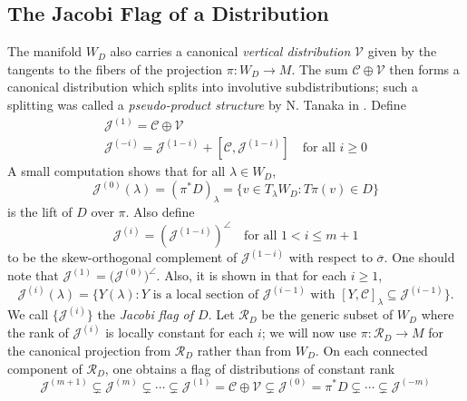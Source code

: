 \documentclass[11pt,letterpaper]{amsart}
\numberwithin{equation}{section}
\newcommand{\oline}{\overline}
\begin{document}
\subsection{The Jacobi Flag of a Distribution}
\label{subsection: CanFlag}
The manifold $W_D$ also carries a canonical \emph{vertical distribution} $\mathcal{V}$ given by the tangents to the fibers of the projection $\pi:W_D\to M$. The sum $\mathcal{C}\oplus \mathcal{V}$ then forms a canonical distribution which splits into involutive subdistributions; such a splitting was called a \emph{pseudo-product structure} by N. Tanaka in \cite{Tanaka1970}. Define
\begin{gather}
    \label{J1 def}
    \mathcal{J}^{(1)} = \mathcal{C}\oplus \mathcal{V}
    \\
    \label{J(-i) def}
    \mathcal{J}^{(-i)} = \mathcal{J}^{(1-i)} + [\mathcal{C},\mathcal{J}^{(1-i)}]\quad\text{for all }i\geq 0
\end{gather}
A small computation shows that for all $\lambda\in W_D$,
\begin{equation}
    \label{J0 fact}
    \mathcal{J}^{(0)}(\lambda) = (\pi^*D)_\lambda = \{v\in T_\lambda W_D: T\pi(v) \in D\}
\end{equation} is the lift of $D$ over $\pi$. Also define
\begin{equation}
    \mathcal{J}^{(i)} =(\mathcal{J}^{(1-i)})^{\angle}\quad \text{for all }1<i\leq m+1
\end{equation}
to be the skew-orthogonal complement of $\mathcal{J}^{(1-i)}$ with respect to $\oline{\sigma}$. One should note that $\mathcal{J}^{(1)} = \big(\mathcal{J}^{(0)}\big)^\angle$. Also, it is shown in \cite[\S2.2]{doubrov2008rank3} that for each $i\geq 1$,
\begin{equation}
    \label{osculation property}
    \mathcal{J}^{(i)}(\lambda) = \big\{Y(\lambda): Y\text{ is a local section of }\mathcal{J}^{(i-1)}\text{ with } [Y,\mathcal{C}]_\lambda\subseteq \mathcal{J}^{(i-1)} \big\}.
\end{equation}
 We call $\{\mathcal{J}^{(i)}\}$ the \emph{Jacobi flag of $D$}.
 Let $\mathcal{R}_D$ be the generic subset of $W_D$ where the rank of $\mathcal{J}^{(i)}$ is locally constant for each $i$; we will now use $\pi:\mathcal{R}_D\to M$ for the canonical projection from $\mathcal{R}_D$ rather than from $W_D$. On each connected component of $\mathcal{R}_D$, one obtains a flag of distributions of constant rank
\begin{equation}
    \label{Char flag}
    \mathcal{J}^{(m+1)}\subsetneq \mathcal{J}^{(m)}\subsetneq \cdots\subsetneq \mathcal{J}^{(1)}= \mathcal{C}\oplus \mathcal{V} \subsetneq \mathcal{J}^{(0)} = \pi^*D \subsetneq \cdots\subsetneq \mathcal{J}^{(-m)}
\end{equation}
\end{document}
